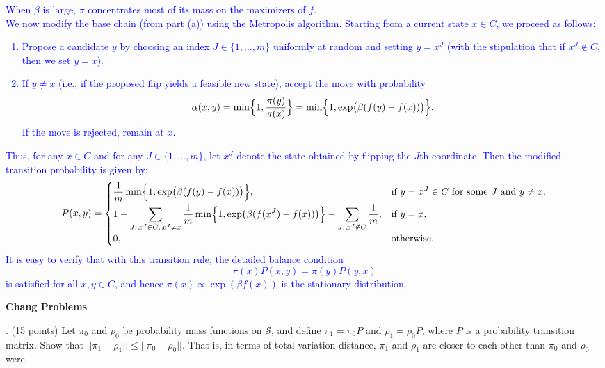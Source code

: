 \documentclass{article}
\begin{document}
\begin{itemize}
    \textcolor{blue}{
When \(\beta\) is large, \(\pi\) concentrates most of its mass on the maximizers of \( f \). \\
We now modify the base chain (from part (a)) using the Metropolis algorithm. Starting from a current state \( x \in C \), we proceed as follows:
\begin{enumerate}
    \item Propose a candidate \( y \) by choosing an index \( J \in \{1,\dots, m\} \) uniformly at random and setting \( y = x^J \) (with the stipulation that if \( x^J \notin C \), then we set \( y = x \)).
    \item If \( y \neq x \) (i.e., if the proposed flip yields a feasible new state), accept the move with probability
    \[
    \alpha(x,y) = \min\Bigl\{ 1, \frac{\pi(y)}{\pi(x)} \Bigr\} 
    = \min\Bigl\{ 1, \exp\bigl(\beta (f(y)-f(x))\bigr) \Bigr\}.
    \]
    If the move is rejected, remain at \( x \).
\end{enumerate}
Thus, for any \( x\in C \) and for any \( J\in \{1,\dots,m\} \), let \( x^J \) denote the state obtained by flipping the \(J\)th coordinate. Then the modified transition probability is given by:
\[
P(x,y)=
\begin{cases}
\displaystyle \frac{1}{m}\min\Bigl\{1, \exp\bigl(\beta (f(y)-f(x))\bigr)\Bigr\}, & \text{if } y = x^J \in C \text{ for some } J \text{ and } y \neq x,\\[2mm]
\displaystyle 1 - \sum_{J:\, x^J \in C,\, x^J \neq x} \frac{1}{m}\min\Bigl\{1, \exp\bigl(\beta (f(x^J)-f(x))\bigr)\Bigr\} - \sum_{J:\, x^J \notin C} \frac{1}{m}, & \text{if } y = x,\\[2mm]
0, & \text{otherwise.}
\end{cases}
\]
It is easy to verify that with this transition rule, the detailed balance condition
\[
\pi(x)P(x,y) = \pi(y)P(y,x)
\]
is satisfied for all \( x,y\in C \), and hence \(\pi(x) \propto \exp(\beta f(x))\) is the stationary distribution.
    }

\end{itemize}

\textbf{Chang Problems}

. (15 points) Let $\pi_0$ and $\rho_0$ be probability mass
functions on $\mathcal{S}$, and define $\pi_1 = \pi_0 P$ and $\rho_1 = \rho_0
P$, where $P$ is a probability transition matrix. Show that $||\pi_1 - \rho_1||
\leq ||\pi_0 - \rho_0||$. That is, in terms of total variation distance, $\pi_1$
and $\rho_1$ are closer to each other than $\pi_0$ and $\rho_0$ were.
\end{document}
